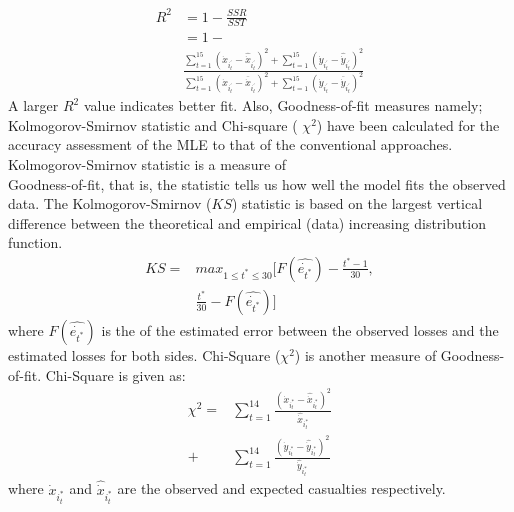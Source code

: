 \documentclass[]{article}
\begin{document}
\tiny
\begin{equation}\label{eq15}
\begin{split}
    R^2&=1-\frac{SSR}{SST}\\
    &=1-\\
    &\frac{\sum_{t=1}^{15}{(\Dot{x}_{i^{'}_t}-\hat{\Dot{x}}_{i^{'}_t})^2+\sum_{t=1}^{15}{(\Dot{y}_{i^{'}_t}-\hat{\Dot{y}}_{i^{'}_t})^2}}}{\sum_{t=1}^{15}{(\Dot{x}_{i^{'}_t}-\overline{\Dot{x}}_{i^{'}_t})^2+\sum_{t=1}^{15}{(\Dot{y}_{i^{'}_t}-\overline{\Dot{y}}_{i^{'}_t})^2}}}
\end{split}
\end{equation}
\normalsize
A larger $R^2$ value indicates better fit. Also, Goodness-of-fit measures namely; Kolmogorov-Smirnov statistic \autocite{Agustino:1986} and Chi-square ( ${\chi}^2$) \autocite{Agustino:1986} have been calculated for the accuracy assessment of the MLE to that of the conventional approaches. Kolmogorov-Smirnov statistic is a measure of \\Goodness-of-fit, that is, the statistic tells us how well the model fits the observed data. The Kolmogorov-Smirnov ($KS$) statistic is based on the largest vertical difference between the theoretical and empirical (data) increasing distribution function.
\begin{equation}
\begin{split}
KS=&{max}_{1\leq{t^*}\leq30}[F(\hat{\Dot{e_{t^*}}})-\frac{t^*-1}{30},\\
&\frac{t^*}{30}-F(\hat{\Dot{e_{t^*}}})]    
\end{split}
\end{equation}
where $F(\hat{\Dot{e_{t^*}}})$ is the  of the estimated error between the observed losses and the estimated losses for both sides. Chi-Square  (${\chi}^2$) is another measure of Goodness-of-fit. Chi-Square is given as:
\begin{equation}
\begin{split}
    \chi^2=&\sum_{t=1}^{14}\frac{({\Dot{x}}_{i^{*}_t}-\hat{\Dot{x}}_{i^{*}_t})^2}{\hat{\Dot{x}}_{i^{*}_t}} \\+&\sum_{t=1}^{14}\frac{({\Dot{y}}_{i^{*}_t}-\hat{\Dot{y}}_{i^{*}_t})^2}{\hat{\Dot{y}}_{i^{*}_t}}  
\end{split}
\end{equation}
where ${\Dot{x}}_{i^{*}_t}$ and $\hat{\Dot{x}}_{i^{*}_t}$ are the observed and expected casualties respectively.
\end{document}
